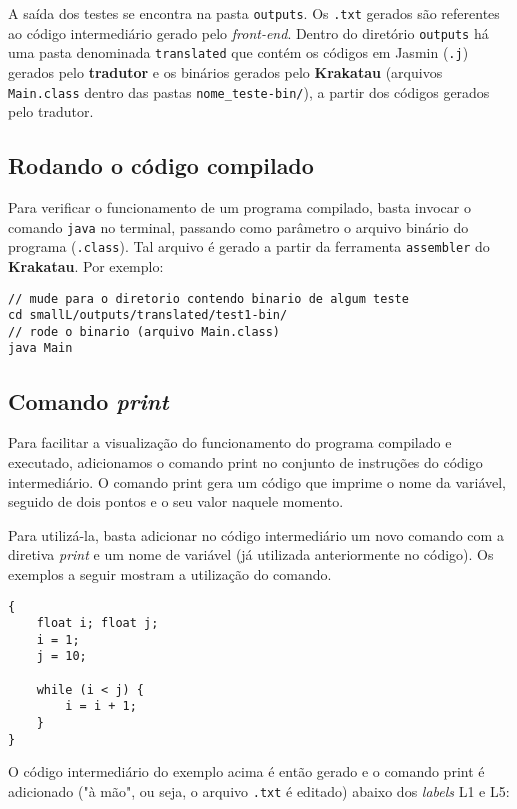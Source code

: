A saída dos testes se encontra na pasta \texttt{outputs}. Os \texttt{.txt} gerados são referentes ao código intermediário gerado pelo \textit{front-end}. Dentro do diretório \texttt{outputs} há uma pasta denominada \texttt{translated} que contém os códigos em Jasmin (\texttt{.j}) gerados pelo \textbf{tradutor} e os binários gerados pelo \textbf{Krakatau} (arquivos \texttt{Main.class} dentro das pastas \texttt{nome\_teste-bin/}), a partir dos códigos gerados pelo tradutor.

\subsection{Rodando o código compilado}

Para verificar o funcionamento de um programa compilado, basta invocar o comando \texttt{java} no terminal, passando como parâmetro o arquivo binário do programa (\texttt{.class}). Tal arquivo é gerado a partir da ferramenta \texttt{assembler} do \textbf{Krakatau}. Por exemplo:

\begin{lstlisting}
// mude para o diretorio contendo binario de algum teste
cd smallL/outputs/translated/test1-bin/
// rode o binario (arquivo Main.class)
java Main
\end{lstlisting}

\subsection{Comando \textit{print}}

Para facilitar a visualização do funcionamento do programa compilado e executado, adicionamos o comando print no conjunto de instruções do código intermediário. O comando print gera um código que imprime o nome da variável, seguido de dois pontos e o seu valor naquele momento.

Para utilizá-la, basta adicionar no código intermediário um novo comando com a diretiva \textit{print} e um nome de variável (já utilizada anteriormente no código). Os exemplos a seguir mostram a utilização do comando.

\begin{lstlisting}[caption=Codigo na linguagem SmallL.]
{
    float i; float j;
    i = 1;
    j = 10;

    while (i < j) {
        i = i + 1;
    }
}
\end{lstlisting}

O código intermediário do exemplo acima é então gerado e o comando print é adicionado ("à mão", ou seja, o arquivo \texttt{.txt} é editado) abaixo dos \textit{labels} L1 e L5:

